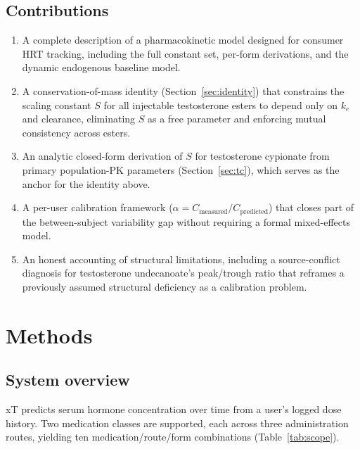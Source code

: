 \documentclass[11pt,a4paper]{article}
\begin{document}
\subsection{Contributions}

\begin{enumerate}[nosep,leftmargin=1.4em]
\item A complete description of a pharmacokinetic model designed for
  consumer HRT tracking, including the full constant set, per-form
  derivations, and the dynamic endogenous baseline model.
\item A conservation-of-mass identity (Section~\ref{sec:identity}) that
  constrains the scaling constant $S$ for all injectable testosterone
  esters to depend only on $k_e$ and clearance, eliminating $S$ as a
  free parameter and enforcing mutual consistency across esters.
\item An analytic closed-form derivation of $S$ for testosterone
  cypionate from primary population-PK parameters
  (Section~\ref{sec:tc}), which serves as the anchor for the identity
  above.
\item A per-user calibration framework ($\alpha = C_{\text{measured}} /
  C_{\text{predicted}}$) that closes part of the between-subject
  variability gap without requiring a formal mixed-effects model.
\item An honest accounting of structural limitations, including a
  source-conflict diagnosis for testosterone undecanoate's peak/trough
  ratio that reframes a previously assumed structural deficiency as a
  calibration problem.
\end{enumerate}

\section{Methods}
\label{sec:methods}

\subsection{System overview}
\label{sec:overview}

xT predicts serum hormone concentration over time from a user's logged
dose history. Two medication classes are supported, each across three
administration routes, yielding ten medication/route/form combinations
(Table~\ref{tab:scope}).
\end{document}
